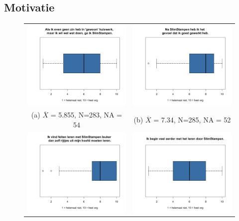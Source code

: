 \documentclass[12pt, a4paper]{article}
\begin{document}
\subsection{Motivatie}
\begin{figure}
    \begin{tabular}{cc}
      \includegraphics[width=65mm]{images/16-TwijfelGaIkSlimStampen.png} &   \includegraphics[width=65mm]{images/19-GevoelGoedGewerkt.png} \\
    (a) $\overline{X}$ = 5.855, N=283, NA = 54   & (b) $\overline{X}$ = 7.34, N=285, NA = 52  \\[6pt]
     \includegraphics[width=65mm]{images/20-SlimStampenLeukerDanRijtjes.png} &   \includegraphics[width=65mm]{images/21-BeginEerder.png} \\

\end{tabular}
\end{figure}
\end{document}
